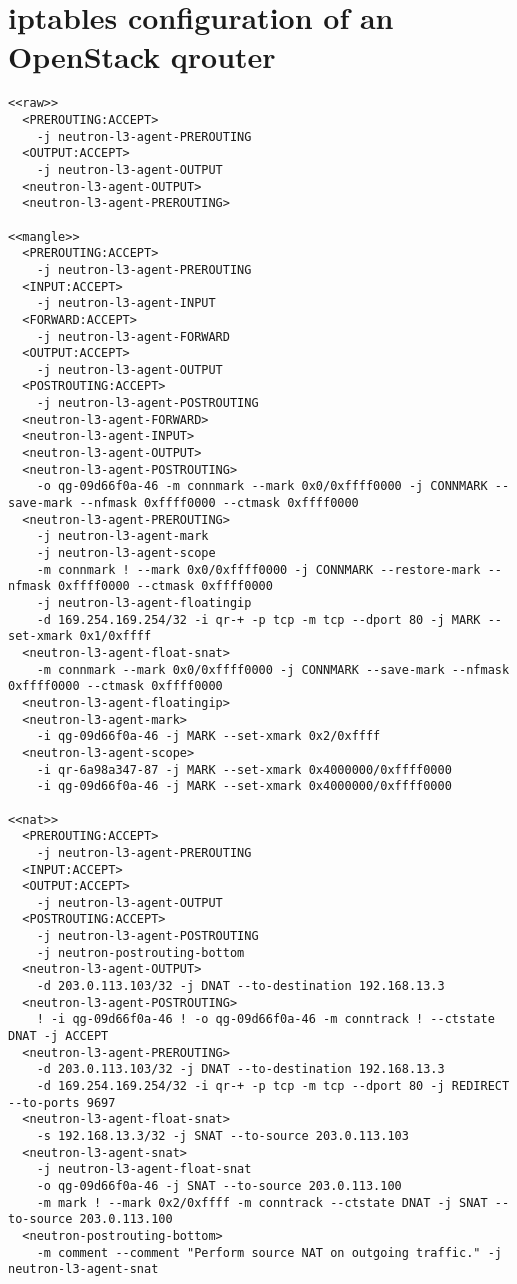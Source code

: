 \chapter{iptables configuration of an OpenStack qrouter}
\label{app:qrouter}

\begin{lstlisting}
<<raw>>
  <PREROUTING:ACCEPT>
    -j neutron-l3-agent-PREROUTING
  <OUTPUT:ACCEPT>
    -j neutron-l3-agent-OUTPUT
  <neutron-l3-agent-OUTPUT>
  <neutron-l3-agent-PREROUTING>

<<mangle>>
  <PREROUTING:ACCEPT>
    -j neutron-l3-agent-PREROUTING
  <INPUT:ACCEPT>
    -j neutron-l3-agent-INPUT
  <FORWARD:ACCEPT>
    -j neutron-l3-agent-FORWARD
  <OUTPUT:ACCEPT>
    -j neutron-l3-agent-OUTPUT
  <POSTROUTING:ACCEPT>
    -j neutron-l3-agent-POSTROUTING
  <neutron-l3-agent-FORWARD>
  <neutron-l3-agent-INPUT>
  <neutron-l3-agent-OUTPUT>
  <neutron-l3-agent-POSTROUTING>
    -o qg-09d66f0a-46 -m connmark --mark 0x0/0xffff0000 -j CONNMARK --save-mark --nfmask 0xffff0000 --ctmask 0xffff0000
  <neutron-l3-agent-PREROUTING>
    -j neutron-l3-agent-mark
    -j neutron-l3-agent-scope
    -m connmark ! --mark 0x0/0xffff0000 -j CONNMARK --restore-mark --nfmask 0xffff0000 --ctmask 0xffff0000
    -j neutron-l3-agent-floatingip
    -d 169.254.169.254/32 -i qr-+ -p tcp -m tcp --dport 80 -j MARK --set-xmark 0x1/0xffff
  <neutron-l3-agent-float-snat>
    -m connmark --mark 0x0/0xffff0000 -j CONNMARK --save-mark --nfmask 0xffff0000 --ctmask 0xffff0000
  <neutron-l3-agent-floatingip>
  <neutron-l3-agent-mark>
    -i qg-09d66f0a-46 -j MARK --set-xmark 0x2/0xffff
  <neutron-l3-agent-scope>
    -i qr-6a98a347-87 -j MARK --set-xmark 0x4000000/0xffff0000
    -i qg-09d66f0a-46 -j MARK --set-xmark 0x4000000/0xffff0000

<<nat>>
  <PREROUTING:ACCEPT>
    -j neutron-l3-agent-PREROUTING
  <INPUT:ACCEPT>
  <OUTPUT:ACCEPT>
    -j neutron-l3-agent-OUTPUT
  <POSTROUTING:ACCEPT>
    -j neutron-l3-agent-POSTROUTING
    -j neutron-postrouting-bottom
  <neutron-l3-agent-OUTPUT>
    -d 203.0.113.103/32 -j DNAT --to-destination 192.168.13.3
  <neutron-l3-agent-POSTROUTING>
    ! -i qg-09d66f0a-46 ! -o qg-09d66f0a-46 -m conntrack ! --ctstate DNAT -j ACCEPT
  <neutron-l3-agent-PREROUTING>
    -d 203.0.113.103/32 -j DNAT --to-destination 192.168.13.3
    -d 169.254.169.254/32 -i qr-+ -p tcp -m tcp --dport 80 -j REDIRECT --to-ports 9697
  <neutron-l3-agent-float-snat>
    -s 192.168.13.3/32 -j SNAT --to-source 203.0.113.103
  <neutron-l3-agent-snat>
    -j neutron-l3-agent-float-snat
    -o qg-09d66f0a-46 -j SNAT --to-source 203.0.113.100
    -m mark ! --mark 0x2/0xffff -m conntrack --ctstate DNAT -j SNAT --to-source 203.0.113.100
  <neutron-postrouting-bottom>
    -m comment --comment "Perform source NAT on outgoing traffic." -j neutron-l3-agent-snat


\end{lstlisting}
